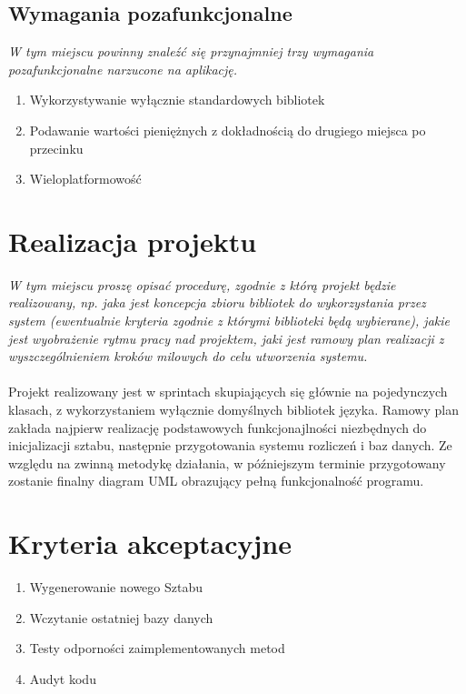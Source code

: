 \documentclass{article}
\begin{document}
\subsection{Wymagania pozafunkcjonalne}
{\small\it W tym miejscu powinny znaleźć się przynajmniej trzy wymagania pozafunkcjonalne narzucone na aplikację.}
\begin{enumerate}
  \item Wykorzystywanie wyłącznie standardowych bibliotek 
  \item Podawanie wartości pieniężnych z dokładnością do drugiego miejsca po przecinku
  \item Wieloplatformowość
\end{enumerate}
\section{Realizacja projektu}
{\small\it W tym miejscu proszę opisać procedurę, zgodnie z którą projekt będzie realizowany, np. jaka jest koncepcja zbioru bibliotek do wykorzystania przez system (ewentualnie kryteria zgodnie z którymi biblioteki będą wybierane), jakie jest wyobrażenie rytmu pracy nad projektem, jaki jest ramowy plan realizacji z wyszczególnieniem kroków milowych do celu utworzenia systemu.}
\\ \\
\textup{Projekt realizowany jest w sprintach skupiających się głównie na pojedynczych klasach, z wykorzystaniem wyłącznie domyślnych bibliotek języka. Ramowy plan zakłada najpierw realizację podstawowych funkcjonajlności niezbędnych do inicjalizacji sztabu, następnie przygotowania systemu rozliczeń i baz danych. Ze względu na zwinną metodykę działania, w późniejszym terminie przygotowany zostanie finalny diagram UML obrazujący pełną funkcjonalność programu.}
\section{Kryteria akceptacyjne}
\begin{enumerate}
  \item Wygenerowanie nowego Sztabu
  \item Wczytanie ostatniej bazy danych
  \item Testy odporności zaimplementowanych metod
  \item Audyt kodu
\end{enumerate}
\end{document}
